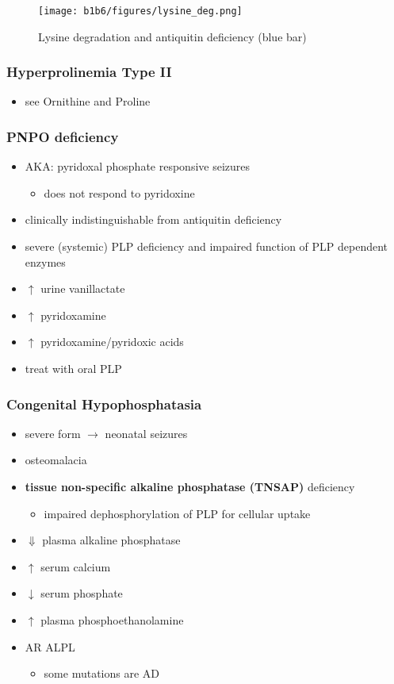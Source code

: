 \documentclass{scrartcl}
\begin{document}
\begin{figure}[htbp]
\centering
\texttt{[image: b1b6/figures/lysine\_deg.png]}
\caption{\label{fig:org0921282}Lysine degradation and antiquitin deficiency (blue bar)}
\end{figure}

\subsubsection{Hyperprolinemia Type II}
\label{sec:org234d565}
\begin{itemize}
\item see Ornithine and Proline
\end{itemize}

\subsubsection{PNPO deficiency}
\label{sec:orgd335988}
\begin{itemize}
\item AKA: pyridoxal phosphate responsive seizures
\begin{itemize}
\item does not respond to pyridoxine
\end{itemize}
\item clinically indistinguishable from antiquitin deficiency
\item severe (systemic) PLP deficiency and impaired function of PLP
dependent enzymes
\item \(\uparrow\) urine vanillactate
\item \(\uparrow\) pyridoxamine
\item \(\uparrow\) pyridoxamine/pyridoxic acids
\item treat with oral PLP
\end{itemize}

\subsubsection{Congenital Hypophosphatasia}
\label{sec:org008dab9}
\begin{itemize}
\item severe form \(\to\) neonatal seizures
\item osteomalacia
\item \textbf{tissue non-specific alkaline phosphatase (TNSAP)} deficiency
\begin{itemize}
\item impaired dephosphorylation of PLP for cellular uptake
\end{itemize}
\item \(\Downarrow\) plasma alkaline phosphatase
\item \(\uparrow\) serum calcium
\item \(\downarrow\) serum phosphate
\item \(\uparrow\) plasma phosphoethanolamine
\item AR ALPL
\begin{itemize}
\item some mutations are AD
\end{itemize}
\end{itemize}
\end{document}
